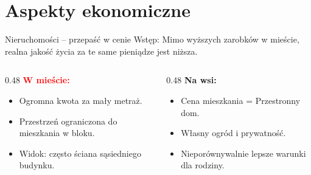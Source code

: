 \section{Aspekty ekonomiczne}

\begin{frame}{Nieruchomości – przepaść w cenie \cite{link4}}
    Wstęp: Mimo wyższych zarobków w mieście, realna jakość życia za te same pieniądze jest niższa.

    \vspace{0.5cm}

    \begin{columns}
        \begin{column}{0.48\textwidth}
            \textbf{\textcolor{red}{W mieście:}}
            \begin{itemize}
                \item Ogromna kwota za mały metraż.
                \item Przestrzeń ograniczona do mieszkania w bloku.
                \item Widok: często ściana sąsiedniego budynku.
            \end{itemize}
        \end{column}
        
        \begin{column}{0.48\textwidth}
            \textbf{\textcolor{green!60!black}{Na wsi:}}
            \begin{itemize}
                \item Cena mieszkania = Przestronny dom.
                \item Własny ogród i prywatność.
                \item Nieporównywalnie lepsze warunki dla rodziny.
            \end{itemize}
        \end{column}
    \end{columns}
\end{frame}

